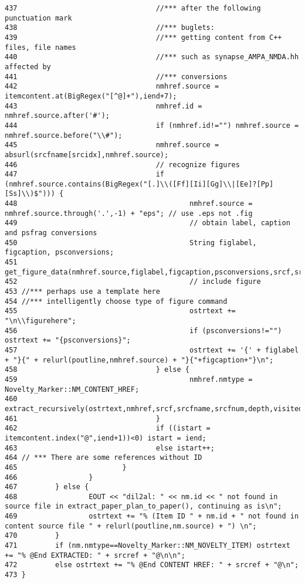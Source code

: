 \begin{verbatim}
437                                 //*** after the following punctuation mark
438                                 //*** buglets:
439                                 //*** getting content from C++ files, file names
440                                 //*** such as synapse_AMPA_NMDA.hh affected by
441                                 //*** conversions
442                                 nmhref.source = itemcontent.at(BigRegex("[^@]+"),iend+7);
443                                 nmhref.id = nmhref.source.after('#');
444                                 if (nmhref.id!="") nmhref.source = nmhref.source.before("\\#");
445                                 nmhref.source = absurl(srcfname[srcidx],nmhref.source);
446                                 // recognize figures
447                                 if (nmhref.source.contains(BigRegex("[.]\\([Ff][Ii][Gg]\\|[Ee]?[Pp][Ss]\\)$"))) {
448                                         nmhref.source = nmhref.source.through('.',-1) + "eps"; // use .eps not .fig
449                                         // obtain label, caption and psfrag conversions
450                                         String figlabel, figcaption, psconversions;
451                                         get_figure_data(nmhref.source,figlabel,figcaption,psconversions,srcf,srcfname,srcfnum);
452                                         // include figure
453 //*** perhaps use a template here
454 //*** intelligently choose type of figure command
455                                         ostrtext += "\n\\figurehere";
456                                         if (psconversions!="") ostrtext += "{psconversions}";
457                                         ostrtext += '{' + figlabel + "}{" + relurl(poutline,nmhref.source) + "}{"+figcaption+"}\n";
458                                 } else {
459                                         nmhref.nmtype = Novelty_Marker::NM_CONTENT_HREF;
460                                         extract_recursively(ostrtext,nmhref,srcf,srcfname,srcfnum,depth,visited,poutline,pprevtext);
461                                 }
462                                 if ((istart = itemcontent.index("@",iend+1))<0) istart = iend;
463                                 else istart++;
464 // *** There are some references without ID
465                         }
466                 }
467         } else {
468                 EOUT << "dil2al: " << nm.id << " not found in source file in extract_paper_plan_to_paper(), continuing as is\n";
469                 ostrtext += "% (Item ID " + nm.id + " not found in content source file " + relurl(poutline,nm.source) + ") \n";
470         }
471         if (nm.nmtype==Novelty_Marker::NM_NOVELTY_ITEM) ostrtext += "% @End EXTRACTED: " + srcref + "@\n\n";
472         else ostrtext += "% @End CONTENT HREF: " + srcref + "@\n";
473 }
\end{verbatim}\normalsize 
{}
